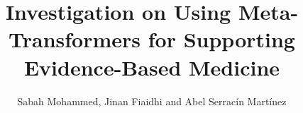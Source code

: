 %
%






\documentclass[journal]{IEEEtran}
\usepackage{graphicx}
\usepackage{caption}
\usepackage{hyperref}
\usepackage{xcolor,soul,framed} %

\usepackage[pdftex]{graphicx}
\graphicspath{{../pdf/}{../jpeg/}}

\usepackage[cmex10]{amsmath}
\usepackage{array}
\usepackage{mdwmath}
\usepackage{mdwtab}
\usepackage{eqparbox}
\usepackage{url}





    \title{Investigation on Using Meta-Transformers for Supporting Evidence-Based Medicine}
  \author{Sabah Mohammed, Jinan Fiaidhi and Abel Serracín Martínez%
    }  




\maketitle



\begin{abstract}
The abstract should not exceed 250 words. It should briefly summarize the content of the paper and address the following points in the format shown. Objective: Briefly state the problem or issue addressed, in language accessible to a general scientific audience. Methods: Succinctly state the methods applied. Results: Provide a brief summary of the results and findings. Discussion/Conclusion: Discuss the contributions of the work and give brief concluding remarks on the outcomes or preliminary assessment.  
\end{abstract}



